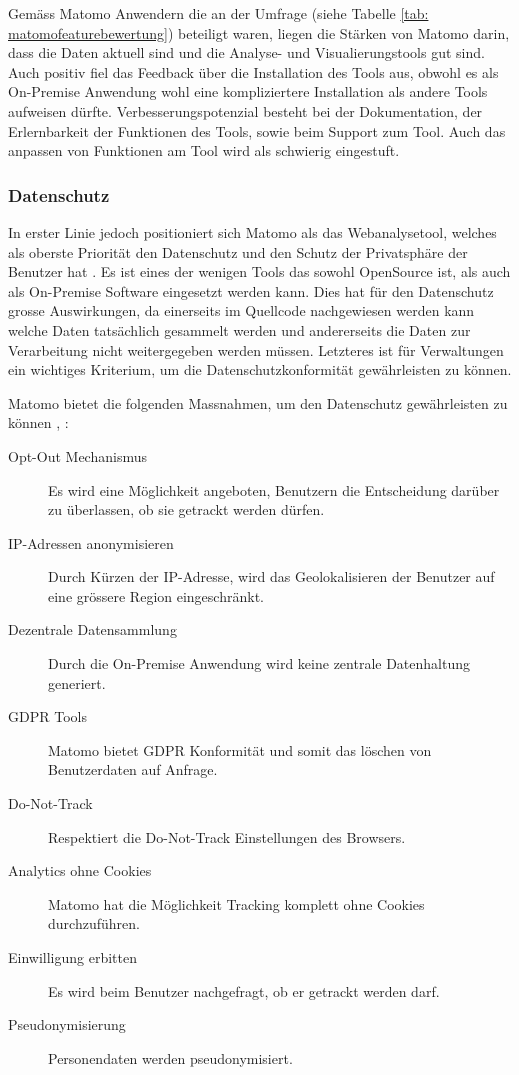 Gemäss Matomo Anwendern die an der Umfrage (siehe Tabelle \ref{tab: matomofeaturebewertung}) beteiligt waren, liegen die Stärken von Matomo darin, dass die Daten aktuell sind und die Analyse- und Visualierungstools gut sind. 
Auch positiv fiel das Feedback über die Installation des Tools aus, obwohl es als On-Premise Anwendung wohl eine kompliziertere Installation als andere Tools aufweisen dürfte.
Verbesserungspotenzial besteht bei der Dokumentation, der Erlernbarkeit der Funktionen des Tools, sowie beim Support zum Tool. Auch das anpassen von Funktionen am Tool wird als schwierig eingestuft.

\subsubsection{Datenschutz}
In erster Linie jedoch positioniert sich Matomo als das Webanalysetool, welches als oberste Priorität den Datenschutz und den Schutz der Privatsphäre der Benutzer hat \parencite{MamotoPrivacy}. Es ist eines der wenigen Tools das sowohl OpenSource ist, als auch als On-Premise Software eingesetzt werden kann. Dies hat für den Datenschutz grosse Auswirkungen, da einerseits im Quellcode nachgewiesen werden kann welche Daten tatsächlich gesammelt werden und andererseits die Daten zur Verarbeitung nicht weitergegeben werden müssen. Letzteres ist für Verwaltungen ein wichtiges Kriterium, um die Datenschutzkonformität gewährleisten zu können.

Matomo bietet die folgenden Massnahmen, um den Datenschutz gewährleisten zu können \parencite{MamotoFeatures}, \parencite{MamotoPrivacy}:

\begin{description}
  \item[Opt-Out Mechanismus] Es wird eine Möglichkeit angeboten, Benutzern die Entscheidung darüber zu überlassen, ob sie getrackt werden dürfen.
  \item[IP-Adressen anonymisieren] Durch Kürzen der IP-Adresse, wird das Geolokalisieren der Benutzer auf eine grössere Region eingeschränkt.
  \item[Dezentrale Datensammlung] Durch die On-Premise  Anwendung wird keine zentrale Datenhaltung generiert.
  \item[GDPR Tools] Matomo bietet GDPR Konformität und somit das löschen von Benutzerdaten auf Anfrage.  
  \item[Do-Not-Track] Respektiert die Do-Not-Track Einstellungen des Browsers.
  \item[Analytics ohne Cookies] Matomo hat die Möglichkeit Tracking komplett ohne Cookies durchzuführen.
  \item[Einwilligung erbitten] Es wird beim Benutzer nachgefragt, ob er getrackt werden darf.
  \item[Pseudonymisierung] Personendaten werden pseudonymisiert.  
\end{description}

